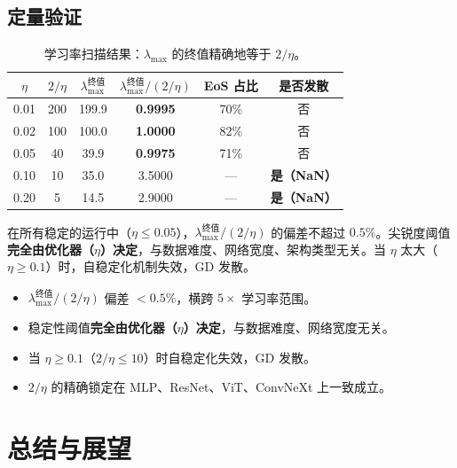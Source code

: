 \documentclass[11pt,a4paper]{ctexart}
\newcommand{\lmax}{\lambda_{\max}}
\begin{document}
\subsection{定量验证}

\begin{table}[ht]
\centering
\caption{学习率扫描结果：$\lmax$ 的终值精确地等于 $2/\eta$。}
\label{tab:universal}
\small
\begin{tabular}{cccccc}
\toprule
$\eta$ & $2/\eta$ & $\lmax^{\text{终值}}$ & $\lmax^{\text{终值}} / (2/\eta)$ & EoS 占比 & 是否发散 \\
\midrule
0.01 & 200 & 199.9 & \textbf{0.9995} & 70\% & 否 \\
0.02 & 100 & 100.0 & \textbf{1.0000} & 82\% & 否 \\
0.05 &  40 &  39.9 & \textbf{0.9975} & 71\% & 否 \\
0.10 &  10 &  35.0 & 3.5000 & — & \textbf{是（NaN）} \\
0.20 &   5 &  14.5 & 2.9000 & — & \textbf{是（NaN）} \\
\bottomrule
\end{tabular}
\end{table}

\begin{keybox}
在所有稳定的运行中（$\eta \leq 0.05$），$\lmax^{\text{终值}} / (2/\eta)$ 的偏差不超过 $0.5\%$。尖锐度阈值\textbf{完全由优化器（$\eta$）决定}，与数据难度、网络宽度、架构类型无关。当 $\eta$ 太大（$\eta \geq 0.1$）时，自稳定化机制失效，GD 发散。
\end{keybox}


\begin{secnote}
\begin{itemize}[leftmargin=1.5em, itemsep=2pt]
  \item $\lmax^{\text{终值}}/(2/\eta)$ 偏差 $<0.5\%$，横跨 $5\times$ 学习率范围。
  \item 稳定性阈值\textbf{完全由优化器（$\eta$）决定}，与数据难度、网络宽度无关。
  \item 当 $\eta \geq 0.1$（$2/\eta \leq 10$）时自稳定化失效，GD 发散。
  \item $2/\eta$ 的精确锁定在 MLP、ResNet、ViT、ConvNeXt 上一致成立。
\end{itemize}
\end{secnote}

\section{总结与展望}\label{sec:summary}
\end{document}
